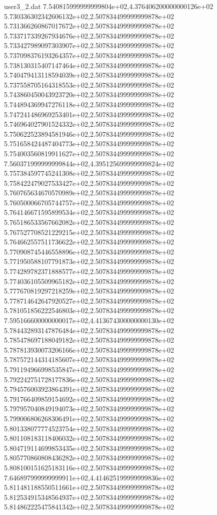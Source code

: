 \begin{filecontents}{user3_2.dat}
7.540815999999999804e+02,4.376406200000000126e+02
5.730336302342606132e+02,2.507834499999999878e+02
5.731366260867017672e+02,2.507834499999999878e+02
5.733717339267934676e+02,2.507834499999999878e+02
5.733427989097303907e+02,2.507834499999999878e+02
5.737098376193264357e+02,2.507834499999999878e+02
5.738130315407147464e+02,2.507834499999999878e+02
5.740479413118594039e+02,2.507834499999999878e+02
5.737558705164318553e+02,2.507834499999999878e+02
5.743860450043923720e+02,2.507834499999999878e+02
5.744894369947276118e+02,2.507834499999999878e+02
5.747241486969253401e+02,2.507834499999999878e+02
5.746964027901524332e+02,2.507834499999999878e+02
5.750622523894581946e+02,2.507834499999999878e+02
5.751658424487404773e+02,2.507834499999999878e+02
5.754003560819911627e+02,2.507834499999999878e+02
7.560371999999999844e+02,4.395125699999999824e+02
5.757384597745241308e+02,2.507834499999999878e+02
5.758422479027533427e+02,2.507834499999999878e+02
5.760765634670570989e+02,2.507834499999999878e+02
5.760500066705744757e+02,2.507834499999999878e+02
5.764146671595899534e+02,2.507834499999999878e+02
5.765186533567662082e+02,2.507834499999999878e+02
5.767527708521229215e+02,2.507834499999999878e+02
5.764662557511736622e+02,2.507834499999999878e+02
5.770908745446558896e+02,2.507834499999999878e+02
5.771950588107791873e+02,2.507834499999999878e+02
5.774289782371888577e+02,2.507834499999999878e+02
5.774036105509965182e+02,2.507834499999999878e+02
5.777670819297218259e+02,2.507834499999999878e+02
5.778714642647920527e+02,2.507834499999999878e+02
5.781051856222546803e+02,2.507834499999999878e+02
7.595166600000000017e+02,4.413674300000000130e+02
5.784432893147876484e+02,2.507834499999999878e+02
5.785478697188049182e+02,2.507834499999999878e+02
5.787813930073206166e+02,2.507834499999999878e+02
5.787572144314185607e+02,2.507834499999999878e+02
5.791194966998535847e+02,2.507834499999999878e+02
5.792242751728177836e+02,2.507834499999999878e+02
5.794576003923864391e+02,2.507834499999999878e+02
5.791766409859154692e+02,2.507834499999999878e+02
5.797957040849194073e+02,2.507834499999999878e+02
5.799006806268306491e+02,2.507834499999999878e+02
5.801338077774523754e+02,2.507834499999999878e+02
5.801108183118406032e+02,2.507834499999999878e+02
5.804719114699853435e+02,2.507834499999999878e+02
5.805770860808436282e+02,2.507834499999999878e+02
5.808100151625183116e+02,2.507834499999999878e+02
7.646897999999999911e+02,4.414625199999999836e+02
5.811481188550511661e+02,2.507834499999999878e+02
5.812534915348564937e+02,2.507834499999999878e+02
5.814862225475841342e+02,2.507834499999999878e+02

\end{filecontents}
